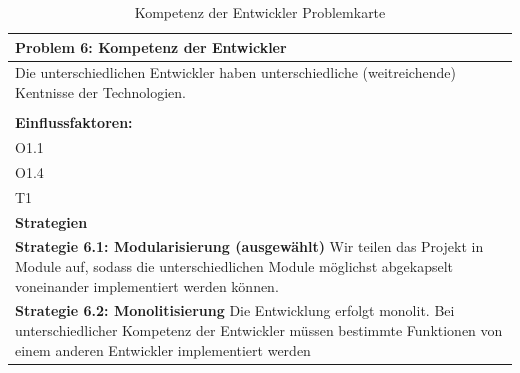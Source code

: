\documentclass[fontsize=12pt,paper=a4,twoside]{scrartcl}
\begin{document}
\begin{table}[H]
    \centering
    \begin{tabular}{|p{15cm}|}
    \hline
          \textbf{Problem 6: Kompetenz der Entwickler}  \\ \hline
	Die unterschiedlichen Entwickler haben unterschiedliche (weitreichende) Kentnisse der Technologien. \\
         \\ \hline
          \textbf{Einflussfaktoren: } \\
	O1.1 \\
	O1.4 \\
	T1 \\
          \hline
          \textbf{Strategien} \\ \hline
            {}          
           \label{strategie:6.1}     
          \textbf{Strategie 6.1: Modularisierung (ausgewählt)} Wir teilen das Projekt in Module auf, sodass die unterschiedlichen Module möglichst abgekapselt voneinander implementiert werden können. \\        
  {}          
           \label{strategie:6.2}              
          \textbf{Strategie 6.2: Monolitisierung} Die Entwicklung erfolgt monolit. Bei unterschiedlicher Kompetenz der Entwickler müssen bestimmte Funktionen von einem anderen Entwickler implementiert werden \\
    \end{tabular}

    \caption{Kompetenz der Entwickler Problemkarte}
    \label{tab:ProblemKarte6}
\end{table}
\end{document}
